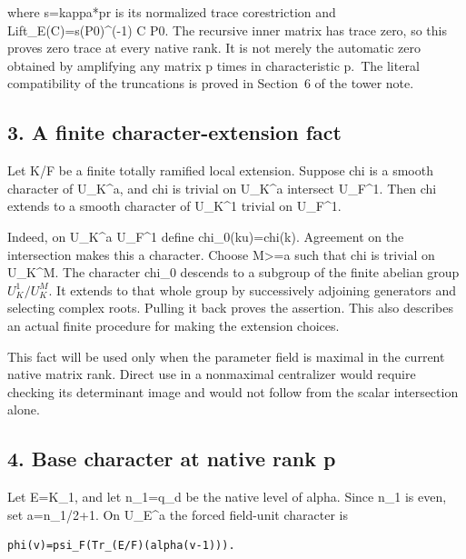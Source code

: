 where s=kappa*pr is its normalized trace corestriction and
Lift\_E(C)=s(P0)\^{}(-1) C P0. The recursive inner matrix has trace
zero, so this proves zero trace at every native rank. It is not merely
the automatic zero obtained by amplifying any matrix p times in
characteristic p.~The literal compatibility of the truncations is proved
in Section~6 of the tower note.

\hypertarget{odd_character-a-finite-character-extension-fact}{%
\subsection{3. A finite character-extension
fact}\label{odd_character-a-finite-character-extension-fact}}

Let K/F be a finite totally ramified local extension. Suppose chi is a
smooth character of U\_K\^{}a, and chi is trivial on U\_K\^{}a intersect
U\_F\^{}1. Then chi extends to a smooth character of U\_K\^{}1 trivial
on U\_F\^{}1.

Indeed, on U\_K\^{}a U\_F\^{}1 define chi\_0(ku)=chi(k). Agreement on
the intersection makes this a character. Choose M\textgreater=a such
that chi is trivial on U\_K\^{}M. The character chi\_0 descends to a
subgroup of the finite abelian group \(U_K^1/U_K^M\). It
extends to that whole group by successively adjoining generators and
selecting complex roots. Pulling it back proves the assertion. This also
describes an actual finite procedure for making the extension choices.

This fact will be used only when the parameter field is maximal in the
current native matrix rank. Direct use in a nonmaximal centralizer would
require checking its determinant image and would not follow from the
scalar intersection alone.

\hypertarget{odd_character-base-character-at-native-rank-p}{%
\subsection{4. Base character at native rank
p}\label{odd_character-base-character-at-native-rank-p}}

Let E=K\_1, and let n\_1=q\_d be the native level of alpha. Since n\_1
is even, set a=n\_1/2+1. On U\_E\^{}a the forced field-unit character is

\begin{Verbatim}[fontsize=\small,breaklines=true,breakanywhere=true]
phi(v)=psi_F(Tr_(E/F)(alpha(v-1))).
\end{Verbatim}

